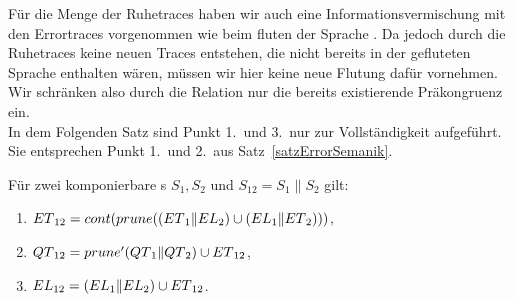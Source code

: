 Für die Menge der Ruhetraces \QT{} haben wir auch eine Informationsvermischung
mit den Errortraces vorgenommen wie beim fluten der Sprache \EL{}. Da jedoch
durch die Ruhetraces keine neuen Traces entstehen, die nicht bereits in der
gefluteten Sprache \EL{} enthalten wären, müssen wir hier keine neue Flutung
dafür vornehmen. Wir schränken also durch die Relation \QRel{} nur die
bereits existierende Präkongruenz \ERel{} ein.\\
In dem Folgenden Satz sind Punkt 1.\ und 3.\ nur zur Vollständigkeit aufgeführt.
Sie entsprechen Punkt 1.\ und 2.\ aus Satz~\ref{satzErrorSemanik}.

\begin{satz}
  \label{satzQuiSemantik}
  Für zwei komponierbare \EIO{}s $S_1, S_2$ und $S_{12} = S_1\|S_2$ gilt:
  \begin{enumerate}
    \item $ET{}_{12} = cont{}(prune{}((ET{}_1\|EL{}_2)\cup (EL{}_1\|ET{}_2)))$,
    \item $QT{}_{12} = prune'(QT{}_1\|QT{}_2)\cup ET{}_{12}$,
    \item $EL{}_{12} = (EL{}_1\|EL{}_2)\cup ET{}_{12}$.
  \end{enumerate}
\end{satz}

